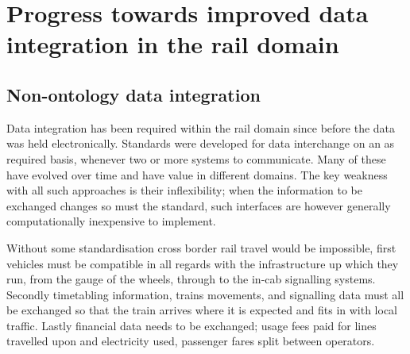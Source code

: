 \section{Progress towards improved data integration in the rail domain}

\subsection{Non-ontology data integration}
Data integration has been required within the rail domain since before the data was held electronically. Standards were developed for data interchange on an as required basis, whenever two or more systems to communicate. Many of these have evolved over time and have value in different domains. The key weakness with all such approaches is their inflexibility; when the information to be exchanged changes so must the standard, such interfaces are however generally computationally inexpensive to implement. 

Without some standardisation cross border rail travel would be impossible, first vehicles must be compatible in all regards with the infrastructure up which they run, from the gauge of the wheels, through to the in-cab signalling systems. Secondly timetabling information, trains movements, and signalling data must all be exchanged so that the train arrives where it is expected and fits in with local traffic. Lastly financial data needs to be exchanged; usage fees paid for lines travelled upon and electricity used, passenger fares split between operators.


